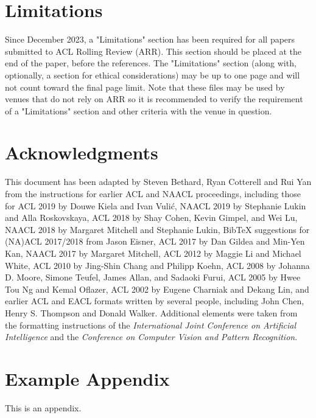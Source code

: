 \documentclass[11pt, a4paper, logo, copyright]{dmml}
\begin{document}
\section*{Limitations}

Since December 2023, a "Limitations" section has been required for all papers submitted to ACL Rolling Review (ARR). This section should be placed at the end of the paper, before the references. The "Limitations" section (along with, optionally, a section for ethical considerations) may be up to one page and will not count toward the final page limit. Note that these files may be used by venues that do not rely on ARR so it is recommended to verify the requirement of a "Limitations" section and other criteria with the venue in question.

\section*{Acknowledgments}

This document has been adapted
by Steven Bethard, Ryan Cotterell and Rui Yan
from the instructions for earlier ACL and NAACL proceedings, including those for
ACL 2019 by Douwe Kiela and Ivan Vuli\'{c},
NAACL 2019 by Stephanie Lukin and Alla Roskovskaya,
ACL 2018 by Shay Cohen, Kevin Gimpel, and Wei Lu,
NAACL 2018 by Margaret Mitchell and Stephanie Lukin,
Bib\TeX{} suggestions for (NA)ACL 2017/2018 from Jason Eisner,
ACL 2017 by Dan Gildea and Min-Yen Kan,
NAACL 2017 by Margaret Mitchell,
ACL 2012 by Maggie Li and Michael White,
ACL 2010 by Jing-Shin Chang and Philipp Koehn,
ACL 2008 by Johanna D. Moore, Simone Teufel, James Allan, and Sadaoki Furui,
ACL 2005 by Hwee Tou Ng and Kemal Oflazer,
ACL 2002 by Eugene Charniak and Dekang Lin,
and earlier ACL and EACL formats written by several people, including
John Chen, Henry S. Thompson and Donald Walker.
Additional elements were taken from the formatting instructions of the \emph{International Joint Conference on Artificial Intelligence} and the \emph{Conference on Computer Vision and Pattern Recognition}.

%

\nobibliography*

\appendix

\section{Example Appendix}
\label{sec:appendix}

This is an appendix.
\end{document}
